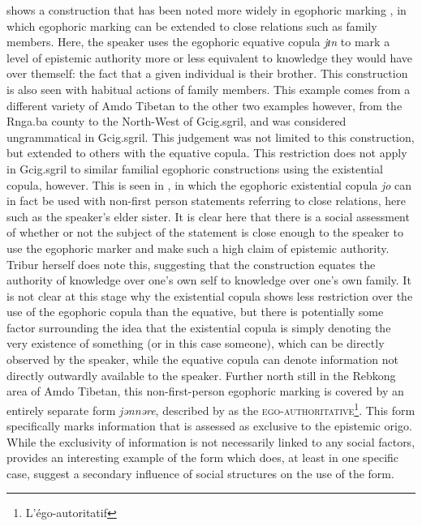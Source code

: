  shows a construction that has been noted more widely in egophoric marking \cite{EgoIntro}, in which egophoric marking can be extended to close relations such as family members. Here, the speaker uses the egophoric equative copula \textit{jɪn} to mark a level of epistemic authority more or less equivalent to knowledge they would have over themself: the fact that a given individual is their brother. This construction is also seen with habitual actions of family members. This example comes from a different variety of Amdo Tibetan to the other two examples however, from the Rnga.ba county to the North-West of Gcig.sgril, and was considered ungrammatical in Gcig.sgril. This judgement was not limited to this construction, but extended to others with the equative copula. This restriction does not apply in Gcig.sgril to similar familial egophoric constructions using the existential copula, however. This is seen in , in which the egophoric existential copula \textit{jo} can in fact be used with non-first person statements referring to close relations, here such as the speaker's elder sister. It is clear here that there is a social assessment of whether or not the subject of the statement is close enough to the speaker to use the egophoric marker and make such a high claim of epistemic authority. Tribur herself does note this, suggesting that the construction equates the authority of knowledge over one's own self to knowledge over one's own family. It is not clear at this stage why the existential copula shows less restriction over the use of the egophoric copula than the equative, but there is potentially some factor surrounding the idea that the existential copula is simply denoting the very existence of something (or in this case someone), which can be directly observed by the speaker, while the equative copula can denote information not directly outwardly available to the speaker. Further north still in the Rebkong area of Amdo Tibetan, this non-first-person egophoric marking is covered by an entirely separate form \textit{jənnəre}, described by  as the \textsc{ego-authoritative}\footnote{L'égo-autoritatif}. This form specifically marks information that is assessed as exclusive to the epistemic origo. While the exclusivity of information is not necessarily linked to any social factors,  provides an interesting example of the form which does, at least in one specific case, suggest a secondary influence of social structures on the use of the form.

